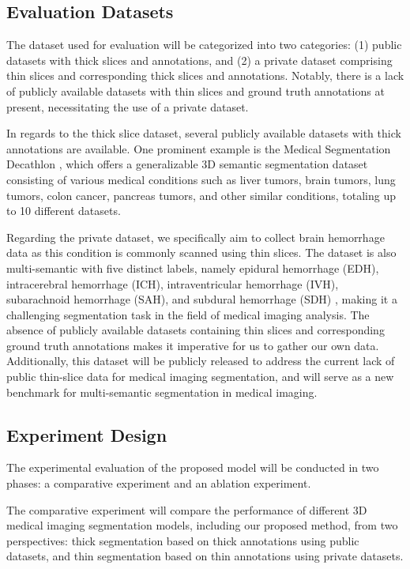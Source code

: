 \documentclass{article}
\begin{document}
\subsection{Evaluation Datasets}

The dataset used for evaluation will be categorized into two categories: (1) public datasets with thick slices and annotations, and (2) a private dataset comprising thin slices and corresponding thick slices and annotations. Notably, there is a lack of publicly available datasets with thin slices and ground truth annotations at present, necessitating the use of a private dataset.

In regards to the thick slice dataset, several publicly available datasets with thick annotations are available. One prominent example is the Medical Segmentation Decathlon \cite{32}, which offers a generalizable 3D semantic segmentation dataset consisting of various medical conditions such as liver tumors, brain tumors, lung tumors, colon cancer, pancreas tumors, and other similar conditions, totaling up to 10 different datasets.

Regarding the private dataset, we specifically aim to collect brain hemorrhage data as this condition is commonly scanned using thin slices. The dataset is also multi-semantic with five distinct labels, namely epidural hemorrhage (EDH), intracerebral hemorrhage (ICH), intraventricular hemorrhage (IVH), subarachnoid hemorrhage (SAH), and subdural hemorrhage (SDH) \cite{33}, making it a challenging segmentation task in the field of medical imaging analysis. The absence of publicly available datasets containing thin slices and corresponding ground truth annotations makes it imperative for us to gather our own data. Additionally, this dataset will be publicly released to address the current lack of public thin-slice data for medical imaging segmentation, and will serve as a new benchmark for multi-semantic segmentation in medical imaging.



\subsection{Experiment Design}

The experimental evaluation of the proposed model will be conducted in two phases: a comparative experiment and an ablation experiment. 

The comparative experiment will compare the performance of different 3D medical imaging segmentation models, including our proposed method, from two perspectives: thick segmentation based on thick annotations using public datasets, and thin segmentation based on thin annotations using private datasets. 
\end{document}
